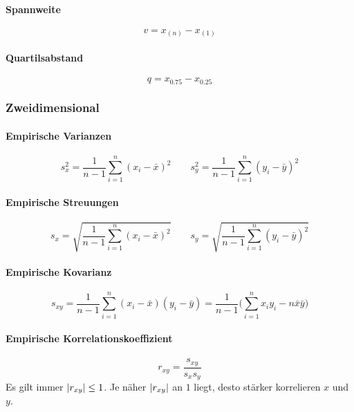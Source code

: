 \paragraph{Spannweite}
\begin{equation*}
	v = x_{(n)} - x_{(1)}
\end{equation*}

\paragraph{Quartilsabstand}
	\begin{equation*}
		q = x_{0.75} - x_{0.25}
	\end{equation*}

\subsubsection{Zweidimensional}
\paragraph{Empirische Varianzen}
\begin{equation*}
	s_x^2 = \frac{1}{n - 1} \sum_{i = 1}^{n} (x_i - \bar{x})^2 \qquad s_y^2 = \frac{1}{n - 1} \sum_{i = 1}^{n} (y_i - \bar{y})^2
\end{equation*}

\paragraph{Empirische Streuungen}
\begin{equation*}
	s_x = \sqrt{\frac{1}{n - 1} \sum_{i = 1}^{n} (x_i - \bar{x})^2} \qquad s_y = \sqrt{\frac{1}{n - 1} \sum_{i = 1}^{n} (y_i - \bar{y})^2}
\end{equation*}

\paragraph{Empirische Kovarianz}
	\begin{equation*}
		s_{xy} = \frac{1}{n - 1} \sum_{i = 1}^{n} (x_i - \bar{x}) (y_i - \bar{y}) = \frac{1}{n - 1} \Bigg( \sum_{i = 1}^n x_i y_i - n\bar{x}\bar{y} \Bigg)
	\end{equation*}

	\paragraph{Empirische Korrelationskoeffizient}
		\begin{equation*}
			r_{xy} = \frac{s_{xy}}{s_x s_y}
		\end{equation*}
		Es gilt immer \( \abs{r_{xy}} \leq 1 \). Je näher \( \abs{r_{xy}} \) an \(1\) liegt, desto stärker korrelieren \(x\) und \(y\).

